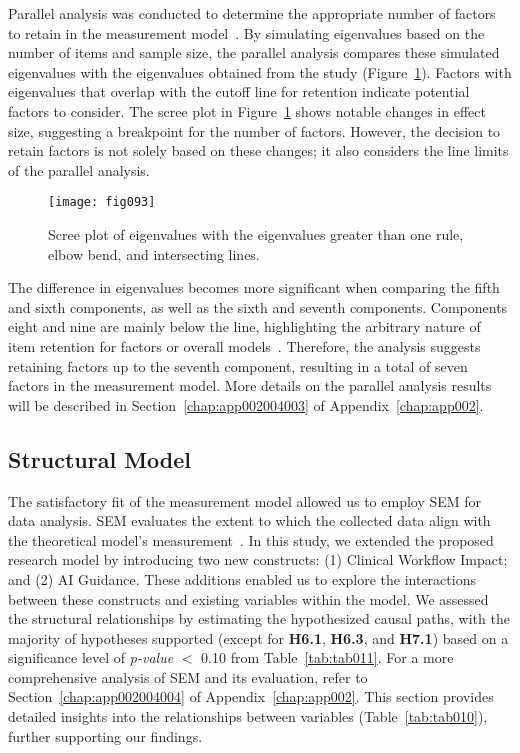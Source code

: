 Parallel analysis was conducted to determine the appropriate number of factors to retain in the measurement model~\cite{doi:10.1080/10705511.2019.1615835}.
By simulating eigenvalues based on the number of items and sample size, the parallel analysis compares these simulated eigenvalues with the eigenvalues obtained from the study \textcolor{revised}{(Figure~\ref{fig:fig093})}.
Factors with eigenvalues that overlap with the cutoff line for retention indicate potential factors to consider.
The scree plot in \textcolor{revised}{Figure~\ref{fig:fig093}} shows notable changes in effect size, suggesting a breakpoint for the number of factors.
However, the decision to retain factors is not solely based on these changes; it also considers the line limits of the parallel analysis.

\begin{figure}[htpb]
\centering
\texttt{[image: fig093]}
\caption{\textcolor{revised}{Scree plot of eigenvalues with the eigenvalues greater than one rule, elbow bend, and intersecting lines.}}
\label{fig:fig093}
\end{figure}

The difference in eigenvalues becomes more significant when comparing the fifth and sixth components, as well as the sixth and seventh components.
Components eight and nine are mainly below the line, highlighting the arbitrary nature of item retention for factors or overall models~\cite{CALISTO2022102922}.
Therefore, the analysis suggests retaining factors up to the seventh component, resulting in a total of seven factors in the measurement model.
More details on the parallel analysis results will be described in Section~\ref{chap:app002004003} of Appendix~\ref{chap:app002}.

\subsection{Structural Model}
\label{sec:chap004005004}

The satisfactory fit of the measurement model allowed us to employ \ac{SEM} for data analysis.
\ac{SEM} evaluates the extent to which the collected data align with the theoretical model's measurement~\cite{doi:10.1080/10705511.2017.1401932}.
In this study, we extended the proposed research model by introducing two new constructs:
(1) Clinical Workflow Impact; and
(2) \ac{AI} Guidance.
These additions enabled us to explore the interactions between these constructs and existing variables within the model.
We assessed the structural relationships by estimating the hypothesized causal paths, with the majority of hypotheses supported (except for {\bf H6.1}, {\bf H6.3}, and {\bf H7.1}) based on a significance level of {\it p-value} $<$ 0.10 from \textcolor{revised}{Table~\ref{tab:tab011}}.
For a more comprehensive analysis of \ac{SEM} and its evaluation, refer to Section~\ref{chap:app002004004} of Appendix~\ref{chap:app002}.
This section provides detailed insights into the relationships between variables \textcolor{revised}{(Table~\ref{tab:tab010})}, further supporting our findings.

